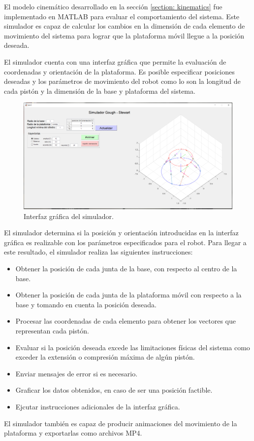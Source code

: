 El modelo cinemático desarrollado en la sección
\ref{section: kinematics} fue implementado en MATLAB
para evaluar el comportamiento del sistema.
Este simulador es capaz de calcular los cambios en 
la dimensión de cada elemento de movimiento del sistema
para lograr que la plataforma móvil 
llegue a la posición deseada.

El simulador cuenta con una interfaz gráfica que permite la 
evaluación de coordenadas y orientación de la plataforma.
Es posible especificar posiciones deseadas y 
los parámetros de movimiento del robot como lo son la
longitud de cada pistón y la dimensión de la base y 
plataforma del sistema.

\begin{figure}
 \centering
 \includegraphics[scale=0.2]{img/principal.png}
 \caption{Interfaz gráfica del simulador.}
 \label{fig: GUI}
\end{figure}


El simulador determina si la posición y 
orientación introducidas en la interfaz gráfica
es realizable con los parámetros especificados para
el robot. Para llegar a este resultado, el simulador realiza
las siguientes instrucciones:

\begin{itemize}
 \item Obtener la posición de cada junta de la base,
 con respecto al centro de la base.
 \item Obtener la posición de cada junta de la
 plataforma móvil con respecto a la base y tomando
 en cuenta la posición deseada.
 \item Procesar las coordenadas de cada elemento para 
 obtener los vectores que representan cada pistón.
 \item Evaluar si la posición deseada excede las 
 limitaciones físicas del sistema como exceder la 
 extensión o compresión máxima de algún pistón.
 \item Enviar mensajes de error si es necesario.
 \item Graficar los datos obtenidos, en caso de ser una
 posición factible.
 \item Ejcutar instrucciones adicionales 
 de la interfaz gráfica.
\end{itemize}

El simulador también es capaz de producir animaciones del 
movimiento de la plataforma y exportarlas como 
archivos MP4.
